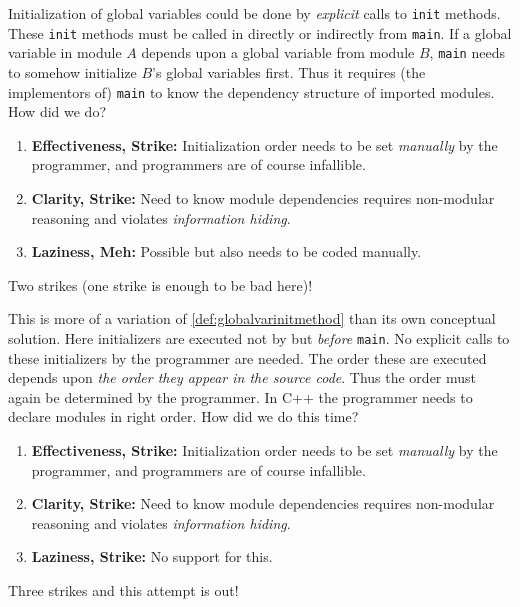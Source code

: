 \documentclass{article}
\begin{document}
\begin{definition}\label{def:globalvarinitmethod}
  Initialization of global variables could be done by \textit{explicit} calls to \texttt{init} methods.
  These \texttt{init} methods must be called in directly or indirectly from \texttt{main}.
  If a global variable in module $A$ depends upon a global variable from module $B$, \texttt{main} needs to somehow initialize $B$'s global variables first.
  Thus it requires (the implementors of) \texttt{main} to know the dependency structure of imported modules.
  How did we do?
  \begin{enumerate}
  \item \textbf{Effectiveness, Strike:} Initialization order needs to be set \textit{manually} by the programmer, and programmers are of course infallible.
  \item \textbf{Clarity, Strike:} Need to know module dependencies requires non-modular reasoning and violates \textit{information hiding}.
  \item \textbf{Laziness, Meh:} Possible but also needs to be coded manually.
  \end{enumerate}
  Two strikes (one strike is enough to be bad here)!
\end{definition}

\begin{example}[C++ Initializers]
  This is more of a variation of \ref{def:globalvarinitmethod} than its own conceptual solution.
  Here initializers are executed not by but \textit{before} \texttt{main}.
  No explicit calls to these initializers by the programmer are needed.
  The order these are executed depends upon \textit{the order they appear in the source code}.
  Thus the order must again be determined by the programmer.
  In C++ the programmer needs to declare modules in right order.
  How did we do this time?
  \begin{enumerate}
  \item \textbf{Effectiveness, Strike:} Initialization order needs to be set \textit{manually} by the programmer, and programmers are of course infallible.
  \item \textbf{Clarity, Strike:} Need to know module dependencies requires non-modular reasoning and violates \textit{information hiding}.
  \item \textbf{Laziness, Strike:} No support for this.
  \end{enumerate}
  Three strikes and this attempt is out!
\end{example}
\end{document}
